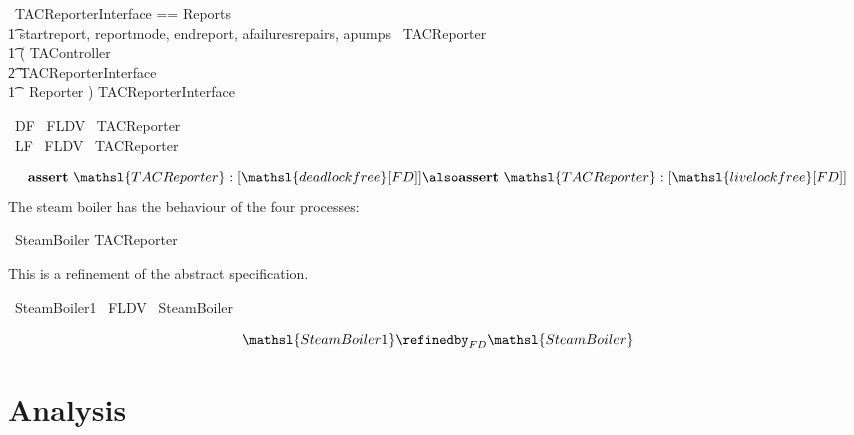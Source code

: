 \documentclass{report}
\begin{document}
\begin{circus}
   \circchannelset\ TACReporterInterface == Reports\ \cup \\
        \t1 \lchanset startreport, reportmode, endreport, afailuresrepairs, apumps \rchanset
   \also
   \circprocess\ TACReporter \circdef \\
    \t1 ( TAController \\
        \t2 \lpar TACReporterInterface \rpar \\
        \t1\ \ Reporter ) \circhide TACReporterInterface
\end{circus}
\begin{circus}
   \circassertref\ DF \circrefines\ FLDV~ TACReporter \\
   \circassertref\ LF \circrefines\ FLDV~ TACReporter \\
\end{circus}
\[
  \mathbf{assert}\ \mathsl{TACReporter} :[ \mathsl{deadlock free } [FD] ]
  \also %
  \mathbf{assert}\ \mathsl{TACReporter} :[ \mathsl{livelock free } [FD] ]
\]
The steam boiler has the behaviour of the four processes:
\begin{circus}
  \circprocess\ SteamBoiler \circdef TACReporter
\end{circus}
This is a refinement of the abstract specification.
\begin{circus}
    \circassertref\ SteamBoiler1 \circrefines\ FLDV~ SteamBoiler
\end{circus}
\[
  \mathsl{SteamBoiler1} \refinedby_{FD} \mathsl{SteamBoiler}
\]


\chapter{Analysis}
\end{document}
